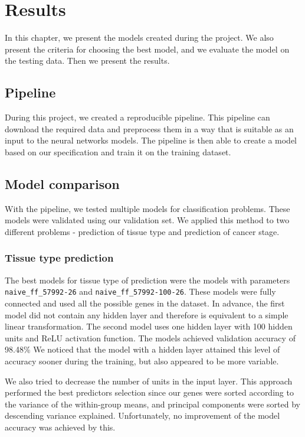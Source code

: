 \chapter{Results}
In this chapter, we present the models created during the project.
We also present the criteria for choosing the best model, and we evaluate the model on the testing data.
Then we present the results.


\section{Pipeline}
During this project, we created a reproducible pipeline.
This pipeline can download the required data and preprocess them in a way that is suitable as an input to the neural networks models.
The pipeline is then able to create a model based on our specification and train it on the training dataset.

\section{Model comparison}
With the pipeline, we tested multiple models for classification problems.
These models were validated using our validation set.
We applied this method to two different problems - prediction of tissue type and prediction of cancer stage.

\subsection{Tissue type prediction}
The best models for tissue type of prediction were the models with parameters \verb'naive_ff_57992-26' and \verb'naive_ff_57992-100-26'.
These models were fully connected and used all the possible genes in the dataset.
In advance, the first model did not contain any hidden layer and therefore is equivalent to a simple linear transformation.
The second model uses one hidden layer with 100 hidden units and ReLU activation function.
The models achieved validation accuracy of 98.48\%
We noticed that the model with a hidden layer attained this level of accuracy sooner during the training, but also appeared to be more variable.

We also tried to decrease the number of units in the input layer.
This approach performed the best predictors selection since our genes were sorted according to the variance of the within-group means, and principal components were sorted by descending variance explained.
Unfortunately, no improvement of the model accuracy was achieved by this.

